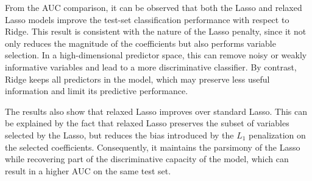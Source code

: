 From the AUC comparison, it can be observed that both the Lasso and relaxed Lasso models improve the test-set classification performance with respect to Ridge. This result is consistent with the nature of the Lasso penalty, since it not only reduces the magnitude of the coefficients but also performs variable selection. In a high-dimensional predictor space, this can remove noisy or weakly informative variables and lead to a more discriminative classifier. By contrast, Ridge keeps all predictors in the model, which may preserve less useful information and limit its predictive performance.

The results also show that relaxed Lasso improves over standard Lasso. This can be explained by the fact that relaxed Lasso preserves the subset of variables selected by the Lasso, but reduces the bias introduced by the \(L_1\) penalization on the selected coefficients. Consequently, it maintains the parsimony of the Lasso while recovering part of the discriminative capacity of the model, which can result in a higher AUC on the same test set.